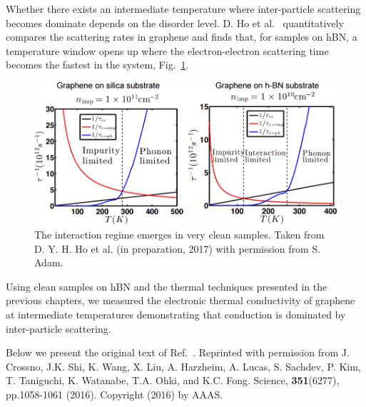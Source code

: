 Whether there exists an intermediate temperature where inter-particle scattering becomes dominate depends on the disorder level. D. Ho et al.~\cite{adam_theoretical_2017} quantitatively compares the scattering rates in graphene and finds that, for samples on hBN, a temperature window opens up where the electron-electron scattering time becomes the fastest in the system, Fig.~\ref{fig:scattering_Tregimes}.
\begin{figure}
\centering
\includegraphics[width=130mm]{figures/Dirac_fluid/temperature_regimes.png}
\caption{The interaction regime emerges in very clean samples. Taken from D. Y. H. Ho et al. (in preparation, 2017) with permission from S. Adam.}
\label{fig:scattering_Tregimes}
\end{figure}

Using clean samples on hBN and the thermal techniques presented in the previous chapters, we measured the electronic thermal conductivity of graphene at intermediate temperatures demonstrating that conduction is dominated by inter-particle scattering. 

Below we present the original text of Ref.~\cite{crossno_observation_2016}. Reprinted with permission from J. Crossno, J.K. Shi, K. Wang, X. Liu, A. Harzheim, A. Lucas, S. Sachdev, P. Kim, T. Taniguchi, K. Watanabe, T.A. Ohki, and K.C. Fong. Science, \textbf{351}(6277), pp.1058-1061 (2016). Copyright (2016) by AAAS.

